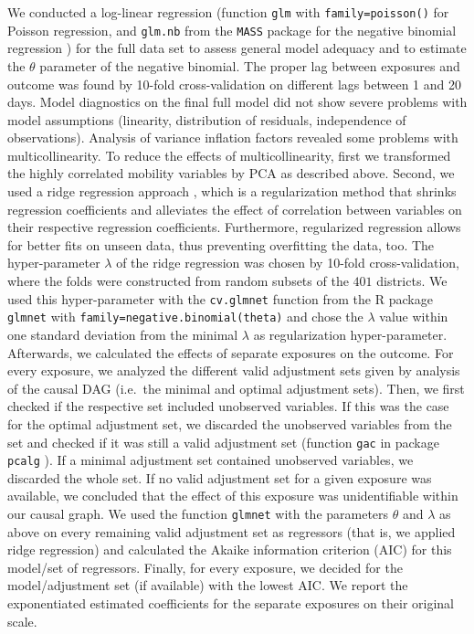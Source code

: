 \documentclass[]{elsarticle} %
\begin{document}
We conducted a log-linear regression (function \texttt{glm} with \texttt{family=poisson()} for Poisson regression, and \texttt{glm.nb} from the \texttt{MASS} package for the negative binomial regression \citep{mass}) for the full data set to assess general model adequacy and to estimate the \(\theta\) parameter of the negative binomial. The proper lag between exposures and outcome was found by 10-fold cross-validation on different lags between 1 and 20 days. Model diagnostics on the final full model did not show severe problems with model assumptions (linearity, distribution of residuals, independence of observations). Analysis of variance inflation factors revealed some problems with multicollinearity. To reduce the effects of multicollinearity, first we transformed the highly correlated mobility variables by PCA as described above. Second, we used a ridge regression approach \citep{ridge1970}, which is a regularization method that shrinks regression coefficients and alleviates the effect of correlation between variables on their respective regression coefficients. Furthermore, regularized regression allows for better fits on unseen data, thus preventing overfitting the data, too. The hyper-parameter \(\lambda\) of the ridge regression was chosen by 10-fold cross-validation, where the folds were constructed from random subsets of the \(401\) districts. We used this hyper-parameter with the \texttt{cv.glmnet} function from the R package \texttt{glmnet} \citep{glmnet2010} with \texttt{family=negative.binomial(theta)} and chose the \(\lambda\) value within one standard deviation from the minimal \(\lambda\) as regularization hyper-parameter. Afterwards, we calculated the effects of separate exposures on the outcome. For every exposure, we analyzed the different valid adjustment sets given by analysis of the causal DAG (i.e.~the minimal and optimal adjustment sets). Then, we first checked if the respective set included unobserved variables. If this was the case for the optimal adjustment set, we discarded the unobserved variables from the set and checked if it was still a valid adjustment set (function \texttt{gac} in package \texttt{pcalg} \citep{perkovi2015complete}). If a minimal adjustment set contained unobserved variables, we discarded the whole set. If no valid adjustment set for a given exposure was available, we concluded that the effect of this exposure was unidentifiable within our causal graph. We used the function \texttt{glmnet} with the parameters \(\theta\) and \(\lambda\) as above on every remaining valid adjustment set as regressors (that is, we applied ridge regression) and calculated the Akaike information criterion (AIC) for this model/set of regressors. Finally, for every exposure, we decided for the model/adjustment set (if available) with the lowest AIC. We report the exponentiated estimated coefficients for the separate exposures on their original scale.
\end{document}
